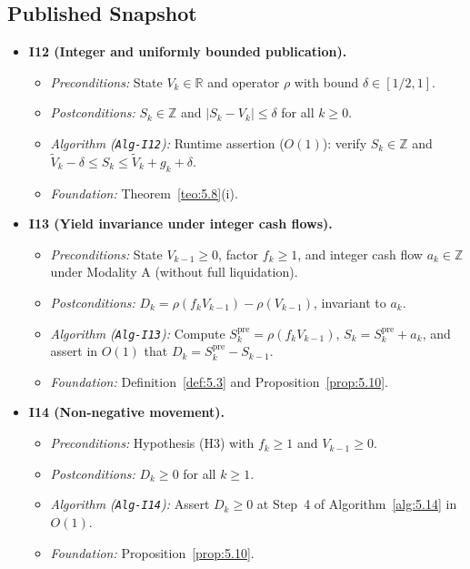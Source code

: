 \documentclass[11pt, a4paper]{article}
\theoremstyle{definition}
\theoremstyle{plain}
\theoremstyle{remark}
\begin{document}
\subsection{Published Snapshot}

\begin{itemize}
    \item \textbf{I12 (Integer and uniformly bounded publication).}
    \begin{itemize}
        \item \emph{Preconditions:} State $V_k \in \mathbb{R}$ and operator $\rho$ with bound $\delta \in [1/2, 1]$.
        \item \emph{Postconditions:} $S_k \in \mathbb{Z}$ and $|S_k - V_k| \le \delta$ for all $k \ge 0$.
        \item \emph{Algorithm (\texttt{Alg-I12}):} Runtime assertion ($O(1)$): verify $S_k \in \mathbb{Z}$ and $\tilde{V}_k - \delta \le S_k \le \tilde{V}_k + g_k + \delta$.
        \item \emph{Foundation:} Theorem~\ref{teo:5.8}(i).
    \end{itemize}

    \item \textbf{I13 (Yield invariance under integer cash flows).}
    \begin{itemize}
        \item \emph{Preconditions:} State $V_{k-1} \ge 0$, factor $f_k \ge 1$, and integer cash flow $a_k \in \mathbb{Z}$ under Modality A (without full liquidation).
        \item \emph{Postconditions:} $D_k = \rho(f_k V_{k-1}) - \rho(V_{k-1})$, invariant to $a_k$.
        \item \emph{Algorithm (\texttt{Alg-I13}):} Compute $S_k^{\text{pre}} = \rho(f_k V_{k-1})$, $S_k = S_k^{\text{pre}} + a_k$, and assert in $O(1)$ that $D_k = S_k^{\text{pre}} - S_{k-1}$.
        \item \emph{Foundation:} Definition~\ref{def:5.3} and Proposition~\ref{prop:5.10}.
    \end{itemize}

    \item \textbf{I14 (Non-negative movement).}
    \begin{itemize}
        \item \emph{Preconditions:} Hypothesis (H3) with $f_k \ge 1$ and $V_{k-1} \ge 0$.
        \item \emph{Postconditions:} $D_k \ge 0$ for all $k \ge 1$.
        \item \emph{Algorithm (\texttt{Alg-I14}):} Assert $D_k \ge 0$ at Step~4 of Algorithm~\ref{alg:5.14} in $O(1)$.
        \item \emph{Foundation:} Proposition~\ref{prop:5.10}.
    \end{itemize}


\end{itemize}
\end{document}
